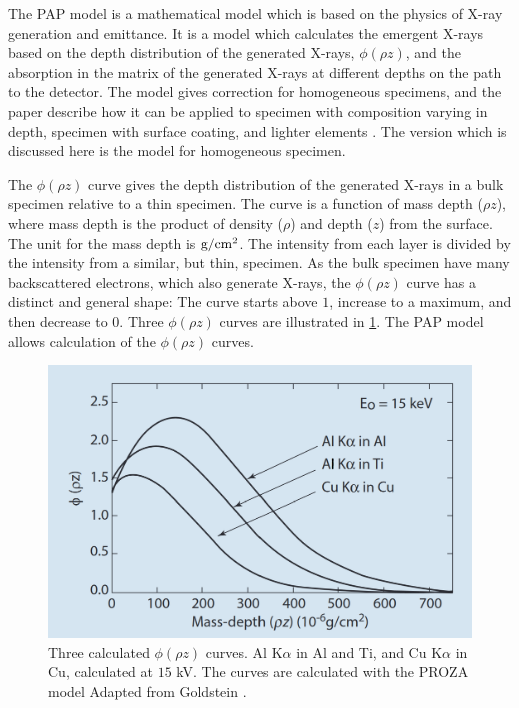 The PAP model is a mathematical model which is based on the physics of X-ray generation and emittance.
It is a model which calculates the emergent X-rays based on the depth distribution of the generated X-rays, $\phi(\rho z)$, and the absorption in the matrix of the generated X-rays at different depths on the path to the detector.
The model gives correction for homogeneous specimens, and the paper describe how it can be applied to specimen with composition varying in depth, specimen with surface coating, and lighter elements \cite{pap_1991}.
The version which is discussed here is the model for homogeneous specimen.



The $\phi(\rho z)$ curve gives the depth distribution of the generated X-rays in a bulk specimen relative to a thin specimen.
The curve is a function of mass depth ($\rho z$), where mass depth is the product of density ($\rho$) and depth ($z$) from the surface. 
The unit for the mass depth is $\textnormal{g}/\textnormal{cm}^2$.
The intensity from each layer is divided by the intensity from a similar, but thin, specimen.
As the bulk specimen have many backscattered electrons, which also generate X-rays, the $\phi(\rho z)$ curve has a distinct and general shape:
The curve starts above $1$, increase to a maximum, and then decrease to $0$.
Three $\phi(\rho z)$ curves are illustrated in \cref{fig:theory:quantification:phi_rho_z_curves}.
The PAP model allows calculation of the $\phi(\rho z)$ curves.




\begin{figure}[htbp]
    \centering
    \includegraphics[width=0.65\linewidth]{figures/phi_rho_z_curves__goldstein.png}
    \caption{
        Three calculated $\phi(\rho z)$ curves.
        Al K$\alpha$ in Al and Ti, and Cu K$\alpha$ in Cu, calculated at $15$ kV.
        The curves are calculated with the PROZA model \cite{bastin_proza_1988}
        Adapted from Goldstein \cite[Fig. 19.9]{goldstein_scanning_2018}.
    }
    \label{fig:theory:quantification:phi_rho_z_curves}
\end{figure}


